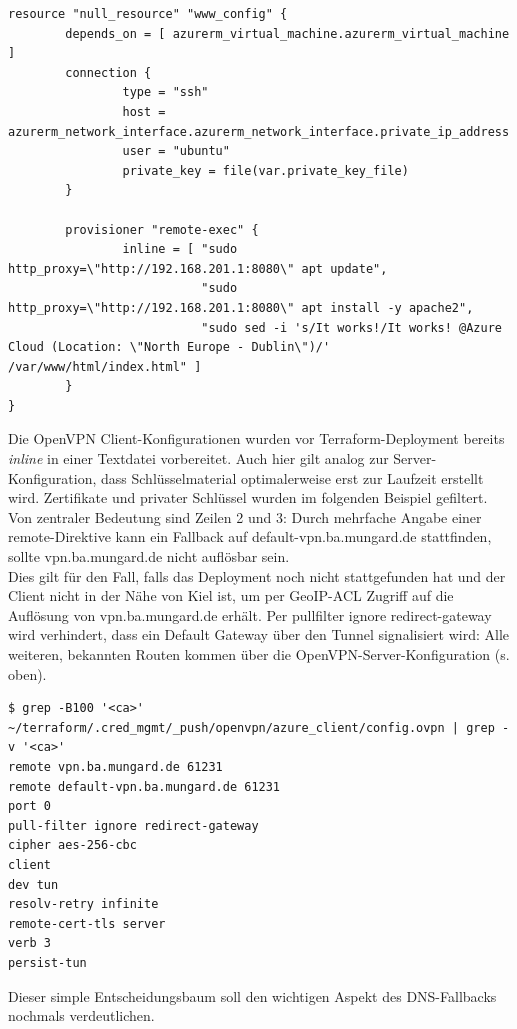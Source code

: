\begin{lstlisting}[label=tf-provider-dns,caption=.]
resource "null_resource" "www_config" {
        depends_on = [ azurerm_virtual_machine.azurerm_virtual_machine ]
        connection {
                type = "ssh"
                host = azurerm_network_interface.azurerm_network_interface.private_ip_address
                user = "ubuntu"
                private_key = file(var.private_key_file)
        }

        provisioner "remote-exec" {
                inline = [ "sudo http_proxy=\"http://192.168.201.1:8080\" apt update",
                           "sudo http_proxy=\"http://192.168.201.1:8080\" apt install -y apache2",
                           "sudo sed -i 's/It works!/It works! @Azure Cloud (Location: \"North Europe - Dublin\")/' /var/www/html/index.html" ]
        }
}
\end{lstlisting}


Die OpenVPN Client-Konfigurationen wurden vor Terraform-Deployment bereits \textit{inline} in einer Textdatei vorbereitet. Auch hier gilt analog zur Server-Konfiguration, dass Schlüsselmaterial optimalerweise erst zur Laufzeit erstellt wird. Zertifikate und privater Schlüssel wurden im folgenden Beispiel gefiltert. Von zentraler Bedeutung sind Zeilen 2 und 3: Durch mehrfache Angabe einer remote-Direktive kann ein Fallback auf default-vpn.ba.mungard.de stattfinden, sollte vpn.ba.mungard.de nicht auflösbar sein.\\
Dies gilt für den Fall, falls das Deployment noch nicht stattgefunden hat und der Client nicht in der Nähe von Kiel ist, um per GeoIP-ACL Zugriff auf die Auflösung von vpn.ba.mungard.de erhält. Per pullfilter ignore redirect-gateway wird verhindert, dass ein Default Gateway über den Tunnel signalisiert wird: Alle weiteren, bekannten Routen kommen über die OpenVPN-Server-Konfiguration (s. oben).

\begin{lstlisting}[label=ovpn-client-conf,caption=.]
$ grep -B100 '<ca>' ~/terraform/.cred_mgmt/_push/openvpn/azure_client/config.ovpn | grep -v '<ca>'
remote vpn.ba.mungard.de 61231
remote default-vpn.ba.mungard.de 61231
port 0
pull-filter ignore redirect-gateway
cipher aes-256-cbc
client
dev tun
resolv-retry infinite
remote-cert-tls server
verb 3
persist-tun
\end{lstlisting}

Dieser simple Entscheidungsbaum soll den wichtigen Aspekt des \glqq DNS-Fallbacks\grqq{} nochmals verdeutlichen.

